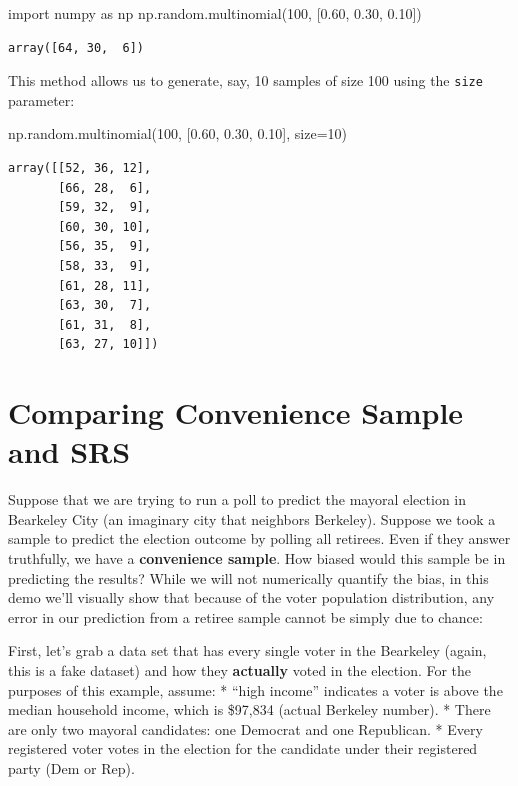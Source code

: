\documentclass[
  letterpaper,
  DIV=11,
  numbers=noendperiod]{scrreprt}
\newenvironment{Shaded}{\begin{snugshade}}{\end{snugshade}}
\newcommand{\DecValTok}[1]{\textcolor[rgb]{0.68,0.00,0.00}{#1}}
\newcommand{\FloatTok}[1]{\textcolor[rgb]{0.68,0.00,0.00}{#1}}
\newcommand{\ImportTok}[1]{\textcolor[rgb]{0.00,0.46,0.62}{#1}}
\newcommand{\NormalTok}[1]{\textcolor[rgb]{0.00,0.23,0.31}{#1}}
\newcommand{\OperatorTok}[1]{\textcolor[rgb]{0.37,0.37,0.37}{#1}}
\begin{document}
\begin{Shaded}
\begin{Highlighting}[]
\ImportTok{import}\NormalTok{ numpy }\ImportTok{as}\NormalTok{ np}
\NormalTok{np.random.multinomial(}\DecValTok{100}\NormalTok{, [}\FloatTok{0.60}\NormalTok{, }\FloatTok{0.30}\NormalTok{, }\FloatTok{0.10}\NormalTok{])}
\end{Highlighting}
\end{Shaded}

\begin{verbatim}
array([64, 30,  6])
\end{verbatim}

This method allows us to generate, say, 10 samples of size 100 using the
\texttt{size} parameter:

\begin{Shaded}
\begin{Highlighting}[]
\NormalTok{np.random.multinomial(}\DecValTok{100}\NormalTok{, [}\FloatTok{0.60}\NormalTok{, }\FloatTok{0.30}\NormalTok{, }\FloatTok{0.10}\NormalTok{], size}\OperatorTok{=}\DecValTok{10}\NormalTok{)}
\end{Highlighting}
\end{Shaded}

\begin{verbatim}
array([[52, 36, 12],
       [66, 28,  6],
       [59, 32,  9],
       [60, 30, 10],
       [56, 35,  9],
       [58, 33,  9],
       [61, 28, 11],
       [63, 30,  7],
       [61, 31,  8],
       [63, 27, 10]])
\end{verbatim}

\hypertarget{comparing-convenience-sample-and-srs}{%
\section{Comparing Convenience Sample and
SRS}\label{comparing-convenience-sample-and-srs}}

Suppose that we are trying to run a poll to predict the mayoral election
in Bearkeley City (an imaginary city that neighbors Berkeley). Suppose
we took a sample to predict the election outcome by polling all
retirees. Even if they answer truthfully, we have a \textbf{convenience
sample}. How biased would this sample be in predicting the results?
While we will not numerically quantify the bias, in this demo we'll
visually show that because of the voter population distribution, any
error in our prediction from a retiree sample cannot be simply due to
chance:

First, let's grab a data set that has every single voter in the
Bearkeley (again, this is a fake dataset) and how they \textbf{actually}
voted in the election. For the purposes of this example, assume: *
``high income'' indicates a voter is above the median household income,
which is \$97,834 (actual Berkeley number). * There are only two mayoral
candidates: one Democrat and one Republican. * Every registered voter
votes in the election for the candidate under their registered party
(Dem or Rep).
\end{document}

